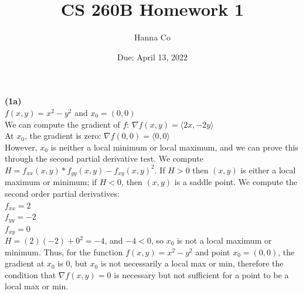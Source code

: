 \documentclass[12pt, letterpaper]{article}
\title{CS 260B Homework 1}
\author{Hanna Co}
\affil{Collaborators: Isha Gonugunta}
\date{Due: April 13, 2022}
\begin{document}
\maketitle
\newpage
\noindent \large{\textbf{(1a)} } \\
$f(x,y) = x^2-y^2$ and $x_0 = (0,0)$\\
We can compute the gradient of $f$: $\nabla f(x,y)=\langle 2x,-2y \rangle$\\
At $x_0$, the gradient is zero: $\nabla f(0,0)=\langle 0,0 \rangle$\\
However, $x_0$ is neither a local minimum or local maximum, and we can prove this through the second partial derivative test. We compute $H=f_{xx}(x,y)*f_{yy}(x,y)-f_{xy}(x,y)^2$. If $H>0$ then $(x,y)$ is either a local maximum or minimum; if $H<0$, then $(x,y)$ is a saddle point. We compute the second order partial derivatives:\\
$f_{xx}=2$\\
$f_{yy}=-2$\\
$f_{xy}=0$\\
$H=(2)(-2)+0^2=-4$, and $-4<0$, so $x_0$ is not a local maximum or minimum. Thus, for the function $f(x,y) = x^2-y^2$ and point $x_0 = (0,0)$, the gradient at $x_0$ is 0, but $x_0$ is not necessarily a local max or min, therefore the condition that $\nabla f(x,y)=0$ is necessary but not sufficient for a point to be a local max or min.
\end{document}
